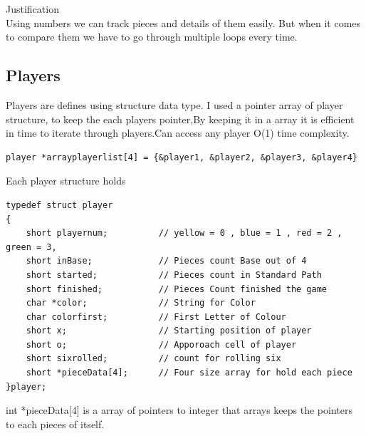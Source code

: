 \documentclass{article}
\begin{document}
Justification\\
Using numbers we can track pieces and details of them easily. But when it comes to compare them we have to go through multiple loops every time.


\subsection{Players}
Players are defines using structure data type. I used a pointer array of player structure, to keep the each players pointer,By keeping it in a array it is efficient in time to iterate through players.Can access any player O(1) time complexity.\\
\begin{verbatim}
player *arrayplayerlist[4] = {&player1, &player2, &player3, &player4}
\end{verbatim}

Each player structure holds
\begin{verbatim}
typedef struct player
{
    short playernum;          // yellow = 0 , blue = 1 , red = 2 , green = 3,
    short inBase;             // Pieces count Base out of 4
    short started;            // Pieces count in Standard Path
    short finished;           // Pieces Count finished the game
    char *color;              // String for Color
    char colorfirst;          // First Letter of Colour
    short x;                  // Starting position of player
    short o;                  // Apporoach cell of player
    short sixrolled;          // count for rolling six 
    short *pieceData[4];      // Four size array for hold each piece
}player;
\end{verbatim}
int *pieceData[4] is a array of pointers to integer that arrays keeps the pointers to each pieces of itself. 
\end{document}
